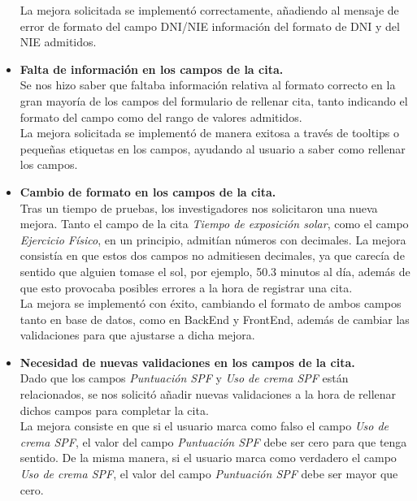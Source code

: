 \begin{itemize}
   La mejora solicitada se implementó correctamente, añadiendo al mensaje de error de formato del campo DNI/NIE información del formato de DNI y del NIE admitidos.
   
    \item\textbf{Falta de información en los campos de la cita.} \\
    Se nos hizo saber que faltaba información relativa al formato correcto en la gran mayoría de los campos del formulario de rellenar cita, tanto indicando el formato del campo como del rango de valores admitidos. \\
    
    La mejora solicitada se implementó de manera exitosa a través de tooltips o pequeñas etiquetas en los campos, ayudando al usuario a saber como rellenar los campos.
    
     \item\textbf{Cambio de formato en los campos de la cita.} \\
     Tras un tiempo de pruebas, los investigadores nos solicitaron una nueva mejora. Tanto el campo de la cita \textit{Tiempo de exposición solar}, como el campo \textit{Ejercicio Físico}, en un principio, admitían números con decimales. La mejora consistía en que estos dos campos no admitiesen decimales, ya que carecía de sentido que alguien tomase el sol, por ejemplo, 50.3 minutos al día, además de que esto provocaba posibles errores a la hora de registrar una cita. \\
     
     La mejora se implementó con éxito, cambiando el formato de ambos campos tanto en base de datos, como en BackEnd y FrontEnd, además de cambiar las validaciones para que ajustarse a dicha mejora.
     
      \item\textbf{Necesidad de nuevas validaciones en los campos de la cita.} \\
      Dado que los campos \textit{Puntuación SPF} y \textit{Uso de crema SPF} están relacionados, se nos solicitó añadir nuevas validaciones a la hora de rellenar dichos campos para completar la cita. \\ 
      
      La mejora consiste en que si el usuario marca como falso el campo \textit{Uso de crema SPF}, el valor del campo \textit{Puntuación SPF} debe ser cero para que tenga sentido. De la misma manera, si el usuario marca como verdadero el campo \textit{Uso de crema SPF}, el valor del campo \textit{Puntuación SPF} debe ser mayor que cero.
      

\end{itemize}

